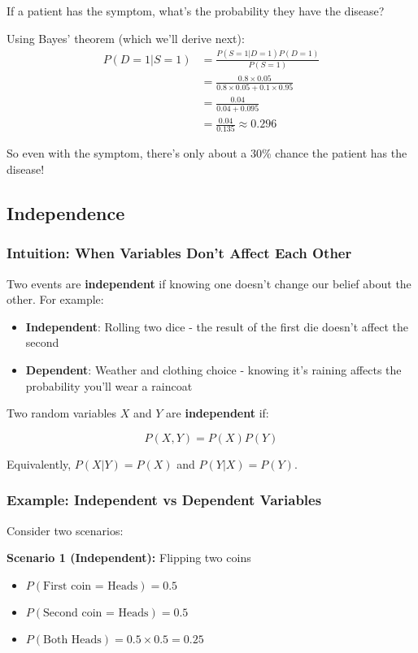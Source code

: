 If a patient has the symptom, what's the probability they have the disease?

Using Bayes' theorem (which we'll derive next):
\begin{align}
P(D=1|S=1) &= \frac{P(S=1|D=1)P(D=1)}{P(S=1)} \\
&= \frac{0.8 \times 0.05}{0.8 \times 0.05 + 0.1 \times 0.95} \\
&= \frac{0.04}{0.04 + 0.095} \\
&= \frac{0.04}{0.135} \approx 0.296
\end{align}

So even with the symptom, there's only about a 30\% chance the patient has the disease!

\subsection{Independence}

\subsubsection{Intuition: When Variables Don't Affect Each Other}

Two events are \textbf{independent} if knowing one doesn't change our belief about the other. For example:
\begin{itemize}
    \item \textbf{Independent}: Rolling two dice - the result of the first die doesn't affect the second
    \item \textbf{Dependent}: Weather and clothing choice - knowing it's raining affects the probability you'll wear a raincoat
\end{itemize}

Two random variables $X$ and $Y$ are \textbf{independent} if:

\begin{equation}
P(X, Y) = P(X)P(Y)
\end{equation}

Equivalently, $P(X|Y) = P(X)$ and $P(Y|X) = P(Y)$.

\subsubsection{Example: Independent vs Dependent Variables}

Consider two scenarios:

\textbf{Scenario 1 (Independent):} Flipping two coins
\begin{itemize}
    \item $P(\text{First coin = Heads}) = 0.5$
    \item $P(\text{Second coin = Heads}) = 0.5$
    \item $P(\text{Both Heads}) = 0.5 \times 0.5 = 0.25$ \checkmark
\end{itemize}

